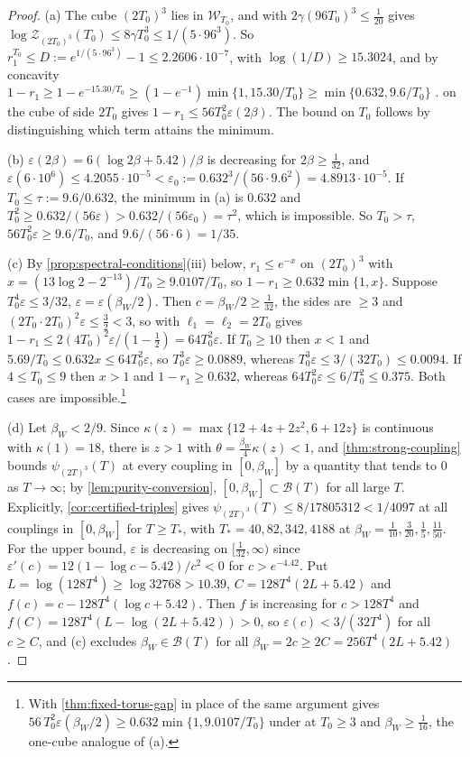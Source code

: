 \documentclass[11pt,a4paper]{amsart}
\theoremstyle{definition}
\theoremstyle{remark}
\numberwithin{equation}{section}
\newcommand{\Wwin}{\mathcal{W}}      %
\newcommand{\TT}{\mathbb{T}}               %
\newcommand{\Zc}{\mathcal{Z}}              %
\newcommand{\Zs}[2]{\Zc_{#1}(#2)}          %
\newcommand{\psiT}[2]{\psi_{#1}(#2)}       %
\newcommand{\cube}[1]{(2#1)^3}             %
\newcommand{\dconst}{\frac{1}{4097}}       %
\newcommand{\dconstinl}{1/4097}            %
\newcommand{\Bcirc}{\text{\upshape(B$^{\circ}$)}}   %
\newcommand{\Bstar}{\text{\upshape(B$^{*}$)}}       %
\newcommand{\betaW}{\beta_{W}}             %
\begin{document}
\begin{proof}
(a) The cube $\cube{T_0}$ lies in $\Wwin_{T_0}$, and \Bstar{} with $2\gamma(96T_0)^3\le\frac1{20}$ gives $\log\Zs{\cube{T_0}}{T_0}\le8\gamma T_0^3\le1/(5\cdot96^3)$. So $r_1^{T_0}\le D:=e^{1/(5\cdot96^3)}-1\le2.2606\cdot10^{-7}$, with $\log(1/D)\ge15.3024$, and by concavity $1-r_1\ge1-e^{-15.30/T_0}\ge(1-e^{-1})\min\{1,15.30/T_0\}\ge\min\{0.632,9.6/T_0\}$ \cite[proof of Corollary~6]{bhattacharjee2026first}.  on the cube of side $2T_0$ gives $1-r_1\le56T_0^2\varepsilon(2\beta)$. The bound on $T_0$ follows by distinguishing which term attains the minimum.

(b) $\varepsilon(2\beta)=6(\log2\beta+5.42)/\beta$ is decreasing for $2\beta\ge\frac1{32}$, and $\varepsilon(6\cdot10^6)\le4.2055\cdot10^{-5}<\varepsilon_0:=0.632^3/(56\cdot9.6^2)=4.8913\cdot10^{-5}$. If $T_0\le\tau:=9.6/0.632$, the minimum in (a) is $0.632$ and $T_0^2\ge0.632/(56\varepsilon)>0.632/(56\varepsilon_0)=\tau^2$, which is impossible. So $T_0>\tau$, $56T_0^2\varepsilon\ge9.6/T_0$, and $9.6/(56\cdot6)=1/35$.

(c) By \cref{prop:spectral-conditions}(iii) below, $r_1\le e^{-x}$ on $\cube{T_0}$ with $x=(13\log2-2^{-13})/T_0\ge9.0107/T_0$, so $1-r_1\ge0.632\min\{1,x\}$. Suppose $T_0^4\varepsilon\le3/32$, $\varepsilon=\varepsilon(\betaW/2)$. Then $c=\betaW/2\ge\frac1{32}$, the sides are $\ge3$ and $(2T_0\cdot2T_0)^2\varepsilon\le\frac32<3$, so \cite[Theorem~8]{bhattacharjee2026first} with $\ell_1=\ell_2=2T_0$ gives $1-r_1\le2(4T_0)^2\varepsilon/(1-\frac12)=64T_0^2\varepsilon$. If $T_0\ge10$ then $x<1$ and $5.69/T_0\le0.632x\le64T_0^2\varepsilon$, so $T_0^3\varepsilon\ge0.0889$, whereas $T_0^3\varepsilon\le3/(32T_0)\le0.0094$. If $4\le T_0\le9$ then $x>1$ and $1-r_1\ge0.632$, whereas $64T_0^2\varepsilon\le6/T_0^2\le0.375$. Both cases are impossible.\footnote{With \cref{thm:fixed-torus-gap} in place of \cite[Theorem~8]{bhattacharjee2026first} the same argument gives $56\,T_0^2\varepsilon(\betaW/2)\ge0.632\min\{1,9.0107/T_0\}$ under \Bcirc{} at $T_0\ge3$ and $\betaW\ge\frac1{16}$, the one-cube analogue of (a).}

(d) Let $\betaW<2/9$. Since $\kappa(z)=\max\{12+4z+2z^2,6+12z\}$ is continuous with $\kappa(1)=18$, there is $z>1$ with $\theta=\frac{\betaW}4\kappa(z)<1$, and \cref{thm:strong-coupling} bounds $\psiT{\cube T}{T}$ at every coupling in $[0,\betaW]$ by a quantity that tends to $0$ as $T\to\infty$; by \cref{lem:purity-conversion}, $[0,\betaW]\subset\mathcal B(T)$ for all large $T$. Explicitly, \cref{cor:certified-triples} gives $\psiT{\cube T}{T}\le8/17805312<\dconstinl$ at all couplings in $[0,\betaW]$ for $T\ge T_*$, with $T_*=40,82,342,4188$ at $\betaW=\frac1{10},\frac3{20},\frac15,\frac{11}{50}$. For the upper bound, $\varepsilon$ is decreasing on $[\frac1{32},\infty)$ since $\varepsilon'(c)=12(1-\log c-5.42)/c^2<0$ for $c>e^{-4.42}$. Put $L=\log(128T^4)\ge\log32768>10.39$, $C=128T^4(2L+5.42)$ and $f(c)=c-128T^4(\log c+5.42)$. Then $f$ is increasing for $c>128T^4$ and $f(C)=128T^4(L-\log(2L+5.42))>0$, so $\varepsilon(c)<3/(32T^4)$ for all $c\ge C$, and (c) excludes $\betaW\in\mathcal B(T)$ for all $\betaW=2c\ge2C=256T^4(2L+5.42)$.


\end{proof}
\end{document}
